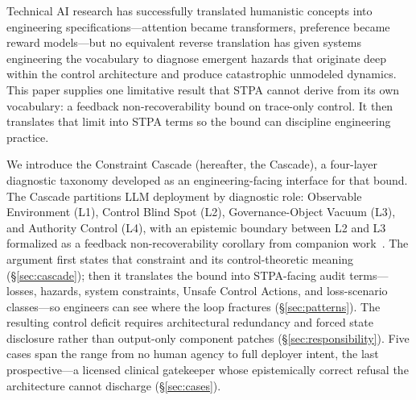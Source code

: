 Technical AI research has successfully translated humanistic concepts into engineering specifications---attention became transformers, preference became reward models---but no equivalent reverse translation has given systems engineering the vocabulary to diagnose emergent hazards that originate deep within the control architecture and produce catastrophic unmodeled dynamics. This paper supplies one limitative result that STPA cannot derive from its own vocabulary: a feedback non-recoverability bound on trace-only control. It then translates that limit into STPA terms so the bound can discipline engineering practice.

We introduce the Constraint Cascade (hereafter, the Cascade), a four-layer diagnostic taxonomy developed as an engineering-facing interface for that bound. The Cascade partitions LLM deployment by diagnostic role: Observable Environment (L1), Control Blind Spot (L2), Governance-Object Vacuum (L3), and Authority Control (L4), with an epistemic boundary between L2 and L3 formalized as a feedback non-recoverability corollary from companion work~\cite{anon2026dual}. The argument first states that constraint and its control-theoretic meaning (\S\ref{sec:cascade}); then it translates the bound into STPA-facing audit terms---losses, hazards, system constraints, Unsafe Control Actions, and loss-scenario classes---so engineers can see where the loop fractures (\S\ref{sec:patterns}). The resulting control deficit requires architectural redundancy and forced state disclosure rather than output-only component patches (\S\ref{sec:responsibility}). Five cases span the range from no human agency to full deployer intent, the last prospective---a licensed clinical gatekeeper whose epistemically correct refusal the architecture cannot discharge (\S\ref{sec:cases}).

